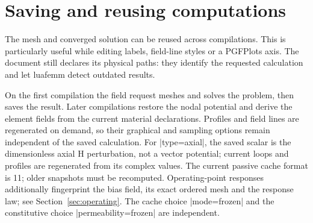 \section{Saving and reusing computations}
\label{sec:cache}
The mesh and converged solution can be reused across compilations. This is
particularly useful while editing labels, field-line styles or a PGFPlots
axis. The document still declares its physical paths: they identify the
requested calculation and let luafemm detect outdated results.

\begin{codeexample}[width=5cm]
\end{codeexample}

On the first compilation the field request meshes and solves the problem,
then saves the result. Later compilations restore the nodal potential and
derive the element fields from the current material declarations. Profiles
and field lines are regenerated on demand, so their graphical and sampling
options remain independent of the saved calculation. For |type=axial|,
the saved scalar is the dimensionless axial H perturbation, not a vector
potential; current loops and profiles are regenerated from its complex values.
The current passive cache format is 11; older snapshots must be recomputed.
Operating-point responses additionally fingerprint the bias field, its exact
ordered mesh and the response law; see Section~\ref{sec:operating}. The cache
choice |mode=frozen| and the constitutive choice |permeability=frozen| are
independent.

